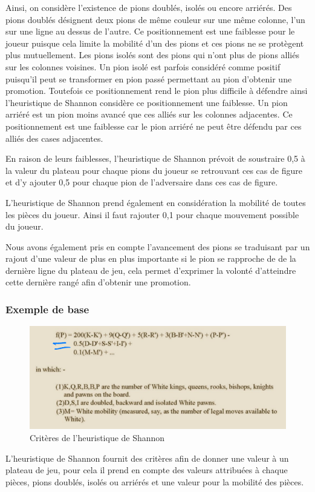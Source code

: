 \huge\documentclass{article}
\begin{document}
    Ainsi, on considère l'existence de pions doublés, isolés ou encore arriérés.
    \newline
    Des pions doublés désignent deux pions de même couleur sur une même colonne, l'un sur une ligne au dessus de l'autre. Ce positionnement est une faiblesse pour le joueur puisque cela limite la mobilité d'un des pions et ces pions ne se protègent plus mutuellement.
    \newline
    Les pions isolés sont des pions qui n'ont plus de pions alliés sur les colonnes voisines. Un pion isolé est parfois considéré comme positif puisqu'il peut se transformer en pion passé permettant au pion d'obtenir une promotion. Toutefois ce positionnement rend le pion plus difficile à défendre ainsi l'heuristique de Shannon considère ce positionnement une faiblesse.
    \newline
    Un pion arriéré est un pion moins avancé que ces alliés sur les colonnes adjacentes. Ce positionnement est une faiblesse car le pion arriéré ne peut être défendu par ces alliés des cases adjacentes.

    En raison de leurs faiblesses, l'heuristique de Shannon prévoit de soustraire 0,5 à la valeur du plateau pour chaque pions du joueur se retrouvant ces cas de figure et d'y ajouter 0,5 pour chaque pion de l'adversaire dans ces cas de figure.
    \newline

    L'heuristique de Shannon prend également en considération la mobilité de toutes les pièces du joueur. Ainsi il faut rajouter 0,1 pour chaque mouvement possible du joueur.
    \newline

    Nous avons également pris en compte l'avancement des pions se traduisant par un rajout d'une valeur de plus en plus importante si le pion se rapproche de de la dernière ligne du plateau de jeu, cela permet d'exprimer la volonté d'atteindre cette dernière rangé afin d'obtenir une promotion.

    \subsubsection{Exemple de base}
    \begin{figure}[h]
        \centering
        \includegraphics[scale=0.6]{img/heuristic_shannon.PNG}
        \caption{Critères de l'heuristique de Shannon\cite{Shannon_Heuristic}}
    \end{figure}
    L'heuristique de Shannon fournit des critères afin de donner une valeur à un plateau de jeu, pour cela il prend en compte des valeurs attribuées à chaque pièces, pions doublés, isolés ou arriérés et une valeur pour la mobilité des pièces.
\end{document}
